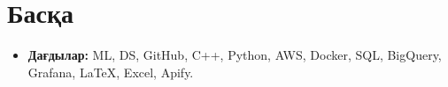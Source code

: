 \documentclass[letterpaper,11pt]{article}
\makeatletter
\newcommand{\resumeItem}[1]{
  \item\small{
    {#1 \vspace{-2pt}}
  }
}
\newcommand{\resumeProjectHeading}[2]{
    \item
    \begin{tabular*}{0.97\textwidth}{l@{\extracolsep{\fill}}r}
      \small#1 & #2 \\
    \end{tabular*}\vspace{-7pt}
}
\newcommand{\resumeSubHeadingListStart}{\begin{itemize}[leftmargin=0.15in, label={}]}
\newcommand{\resumeSubHeadingListEnd}{\end{itemize}}
\newcommand{\resumeItemListStart}{\begin{itemize}}
\newcommand{\resumeItemListEnd}{\end{itemize}\vspace{-5pt}}
\makeatother
\begin{document}

\section{Басқа}
\resumeSubHeadingListStart
  \resumeItem{\textbf{Дағдылар:} ML, DS, GitHub, C++, Python, AWS, Docker, SQL, BigQuery, Grafana, LaTeX, Excel, Apify.}
\resumeSubHeadingListEnd
\end{document}
